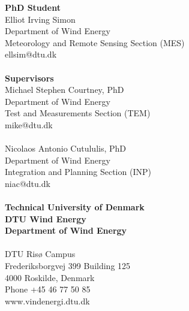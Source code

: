 \thispagestyle{empty} %
\frieze
\vspace*{\fill}
\noindent
\sffamily
\small
\textbf{PhD Student}\\
Elliot Irving Simon\\
Department of Wind Energy\\
Meteorology and Remote Sensing Section (MES)\\
ellsim@dtu.dk\\
\\
\textbf{Supervisors}\\
Michael Stephen Courtney, PhD\\
Department of Wind Energy\\
Test and Measurements Section (TEM)\\
mike@dtu.dk\\
\\
Nicolaos Antonio Cutululis, PhD\\
Department of Wind Energy\\
Integration and Planning Section (INP)\\
niac@dtu.dk\\
\\
\textbf{Technical University of Denmark}\\
\textbf{DTU Wind Energy}\\
\textbf{Department of Wind Energy}\\
\\
DTU Ris{\o} Campus\\
Frederiksborgvej 399
Building 125\\
4000 Roskilde, Denmark\\
Phone +45 46 77 50 85\\
www.vindenergi.dtu.dk\\
\normalsize
\normalfont
\vspace*{2.5cm}